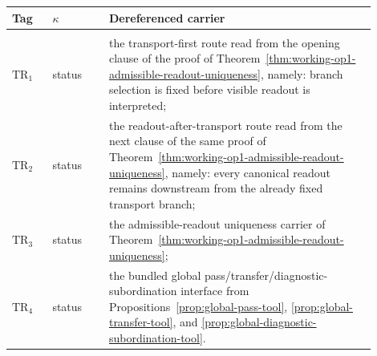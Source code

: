 {\small
\renewcommand{\arraystretch}{1.08}
\begin{center}
\begin{tabular}{@{}>{\raggedright\arraybackslash}p{0.10\linewidth}>{\raggedright\arraybackslash}p{0.14\linewidth}>{\raggedright\arraybackslash}p{0.66\linewidth}@{}}
\toprule
Tag & $\kappa$ & Dereferenced carrier \\
\midrule
\multicolumn{3}{@{}l@{}}{\textbf{Total-rigidity submenu} $M^{\mathrm{rig}}_{\mathrm{tot}}$}\\[0.2em]
$\mathrm{TR}_1$ & status & the transport-first route read from the opening clause of the proof of Theorem~\ref{thm:working-op1-admissible-readout-uniqueness}, namely: branch selection is fixed before visible readout is interpreted;\\
$\mathrm{TR}_2$ & status & the readout-after-transport route read from the next clause of the same proof of Theorem~\ref{thm:working-op1-admissible-readout-uniqueness}, namely: every canonical readout remains downstream from the already fixed transport branch;\\
$\mathrm{TR}_3$ & status & the admissible-readout uniqueness carrier of Theorem~\ref{thm:working-op1-admissible-readout-uniqueness};\\
$\mathrm{TR}_4$ & status & the bundled global pass/transfer/diagnostic-subordination interface from Propositions~\ref{prop:global-pass-tool}, \ref{prop:global-transfer-tool}, and \ref{prop:global-diagnostic-subordination-tool}.\\
\bottomrule
\end{tabular}
\end{center}

}
